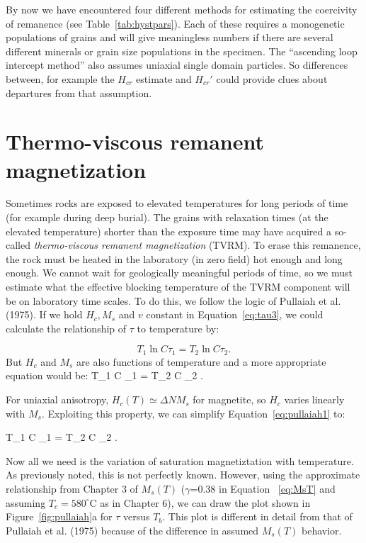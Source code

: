  
  
  

  
  By now we have encountered four different methods for estimating the coercivity of remanence (see Table~\ref{tab:hystpars}).  Each of these requires a monogenetic populations of grains and will give meaningless numbers if there are several different minerals or grain size populations in the specimen.  The ``ascending loop intercept method'' also assumes uniaxial single domain particles.  So differences between, for example the $H_{cr}$ estimate and $H_{cr}'$ could provide clues about departures from that  assumption.    
  


\section{Thermo-viscous remanent magnetization}

Sometimes rocks are exposed to elevated temperatures for long periods of 
time (for example during deep burial). The grains with relaxation times
(at the elevated temperature) shorter than the exposure time may have
acquired a so-called 
{\it thermo-viscous remanent magnetization} (TVRM).  To erase this remanence, the rock must be heated in the laboratory (in zero field) hot enough and long enough.  We cannot wait for geologically meaningful periods of time, so we must estimate what the effective blocking temperature of the TVRM component will be on laboratory time scales.   To do this,  we follow the logic of 
 Pullaiah et al. (1975).    \nocite{pullaiah75} If we hold $H_c, M_s$ and $v$ constant in Equation~\ref{eq:tau3}, we could calculate the
relationship of $\tau$ to temperature by:


$$
T_1 \ln C \tau_1 = T_2 \ln C \tau_2.
$$
But
$H_c$  and $M_s$  are also functions of temperature and  a more appropriate equation would be:
\beq
{{T_1 \ln C \tau_1} } = {{ T_2 \ln C \tau_2}
}.
\label{eq:pullaiah1}
\eeq


\noindent
For uniaxial anisotropy,  $H_c(T)\simeq \Delta N M_s$ for magnetite,  so  $H_c$ varies linearly with $M_s$.  
Exploiting this property, we can simplify Equation~\ref{eq:pullaiah1} to:

\beq
{{T_1 \ln C \tau_1} } = {{ T_2 \ln C \tau_2}
}.
\label{eq:pullaiahM}
\eeq


Now all we need is the variation of saturation magnetiztation with temperature.  As previously noted, this is not perfectly known.  However, using the approximate relationship from Chapter 3 of $M_s(T)$ ($\gamma$=0.38  in Equation ~\ref{eq:MsT} and assuming $T_c=580^{\circ}$C  as in Chapter 6), we  can draw the plot shown in Figure~\ref{fig:pullaiah}a   for
$\tau$ versus  $T_b$.   This plot is different in detail from that of 
\nocite{pullaiah75}
Pullaiah et al. (1975) because of the difference in assumed $M_s(T)$ behavior.  

